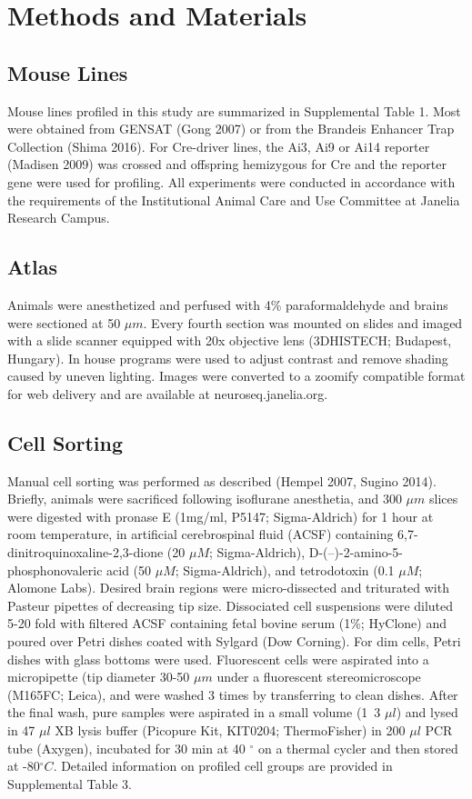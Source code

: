 \section{Methods and Materials}

\subsection{Mouse Lines}
Mouse lines profiled in this study are summarized in Supplemental Table 1. Most were obtained from GENSAT (Gong 2007) or from the Brandeis Enhancer Trap Collection (Shima 2016). For Cre-driver lines, the Ai3, Ai9 or Ai14 reporter (Madisen 2009) was crossed and offspring hemizygous for Cre and the reporter gene were used for profiling. All experiments were conducted in accordance with the requirements of the Institutional Animal Care and Use Committee at Janelia Research Campus.

\subsection{Atlas}
Animals were anesthetized and perfused with 4\% paraformaldehyde and brains were sectioned at 50 $\mu m$. Every fourth section was mounted on slides and imaged with a slide scanner equipped with 20x objective lens (3DHISTECH; Budapest, Hungary). In house programs were used to adjust contrast and remove shading caused by uneven lighting. Images were converted to a zoomify compatible format for web delivery and are available at neuroseq.janelia.org.

\subsection{Cell Sorting}
Manual cell sorting was performed as described (Hempel 2007, Sugino 2014). Briefly, animals were sacrificed following isoflurane anesthetia, and 300 $\mu m$ slices were digested with pronase E (1mg/ml, P5147; Sigma-Aldrich) for 1 hour at room temperature, in artificial cerebrospinal fluid (ACSF) containing 6,7-dinitroquinoxaline-2,3-dione (20 $\mu M$; Sigma-Aldrich), D-(–)-2-amino-5-phosphonovaleric acid (50 $\mu M$; Sigma-Aldrich), and tetrodotoxin (0.1 $\mu M$; Alomone Labs). Desired brain regions were micro-dissected and triturated with Pasteur pipettes of decreasing tip size. Dissociated cell suspensions were diluted 5-20 fold with filtered ACSF containing fetal bovine serum (1\%; HyClone) and poured over Petri dishes coated with Sylgard (Dow Corning). For dim cells, Petri dishes with glass bottoms were used. Fluorescent cells were aspirated into a micropipette (tip diameter 30-50 $\mu m$ under a fluorescent stereomicroscope (M165FC; Leica), and were washed 3 times by transferring to clean dishes. After the final wash, pure samples were aspirated in a small volume (1~3 $\mu l$) and lysed in 47 $\mu l$ XB lysis buffer (Picopure Kit, KIT0204; ThermoFisher) in 200 $\mu l$ PCR tube (Axygen), incubated for 30 min at 40  $^{\circ}$ on a thermal cycler and then stored at -80$^{\circ}C$. Detailed information on profiled cell groups are provided in Supplemental Table 3.


